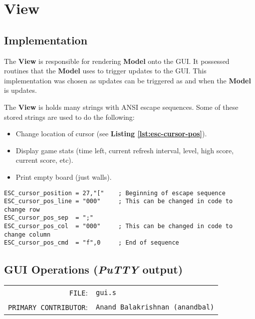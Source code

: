   \section{View}

  \subsection{Implementation}

  The \textbf{View} is responsible for rendering \textbf{Model} onto the GUI. It possessed routines that
  the \textbf{Model} uses to trigger updates to the GUI. This implementation was chosen as updates can
  be triggered as and when the \textbf{Model} is updates.

  The \textbf{View} is holds many strings with ANSI escape sequences. Some of these stored strings are used to do the following:

  \begin{itemize}
    \item Change location of cursor (see \textbf{Listing \ref{lst:esc-cursor-pos}}).
    \item Display game stats (time left, current refresh interval, level, high score, current score, etc).
    \item Print empty board (just walls).
  \end{itemize}

    \begin{lstlisting}[caption={Escape sequence to change cursor position},label={lst:esc-cursor-pos}]
ESC_cursor_position	= 27,"["    ; Beginning of escape sequence
ESC_cursor_pos_line	= "000"     ; This can be changed in code to change row
ESC_cursor_pos_sep	= ";"
ESC_cursor_pos_col	= "000"     ; This can be changed in code to change column
ESC_cursor_pos_cmd	= "f",0     ; End of sequence

  \end{lstlisting}


  \subsection{GUI Operations (\textit{PuTTY} output)}
  \begin{table}[H]
  \begin{tabular}{rl}
    \texttt{FILE}:         &\texttt{gui.s}  \\
    \texttt{PRIMARY CONTRIBUTOR}:    &\texttt{Anand Balakrishnan (anandbal)}
  \end{tabular}
  \end{table}

